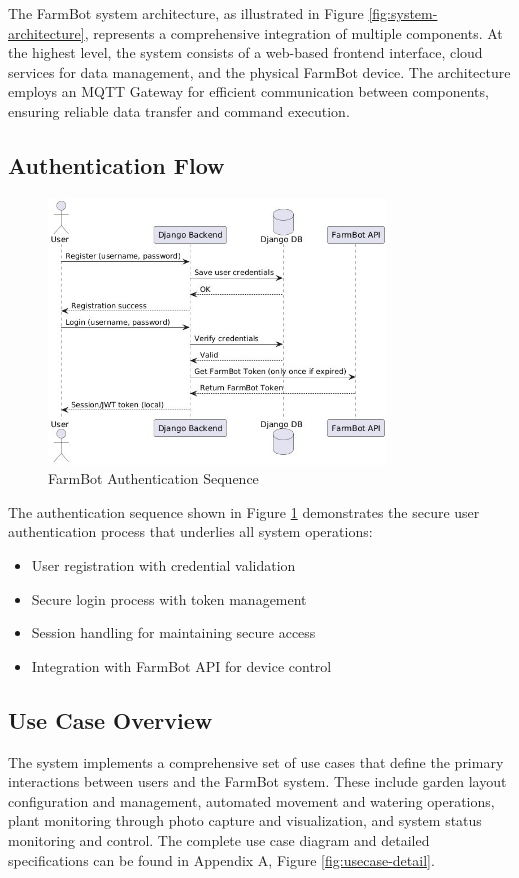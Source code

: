 The FarmBot system architecture, as illustrated in Figure \ref{fig:system-architecture}, represents a comprehensive integration of multiple components. At the highest level, the system consists of a web-based frontend interface, cloud services for data management, and the physical FarmBot device. The architecture employs an MQTT Gateway for efficient communication between components, ensuring reliable data transfer and command execution.

\subsection{Authentication Flow}
\begin{figure}[h]
    \centering
    \includegraphics[width=0.8\textwidth]{img/farmbot-auth.jpg}
    \caption{FarmBot Authentication Sequence}
    \label{fig:auth-sequence}
\end{figure}

The authentication sequence shown in Figure \ref{fig:auth-sequence} demonstrates the secure user authentication process that underlies all system operations:
\begin{itemize}
    \item User registration with credential validation
    \item Secure login process with token management
    \item Session handling for maintaining secure access
    \item Integration with FarmBot API for device control
\end{itemize}

\subsection{Use Case Overview}
The system implements a comprehensive set of use cases that define the primary interactions between users and the FarmBot system. These include garden layout configuration and management, automated movement and watering operations, plant monitoring through photo capture and visualization, and system status monitoring and control. The complete use case diagram and detailed specifications can be found in Appendix A, Figure \ref{fig:usecase-detail}.

